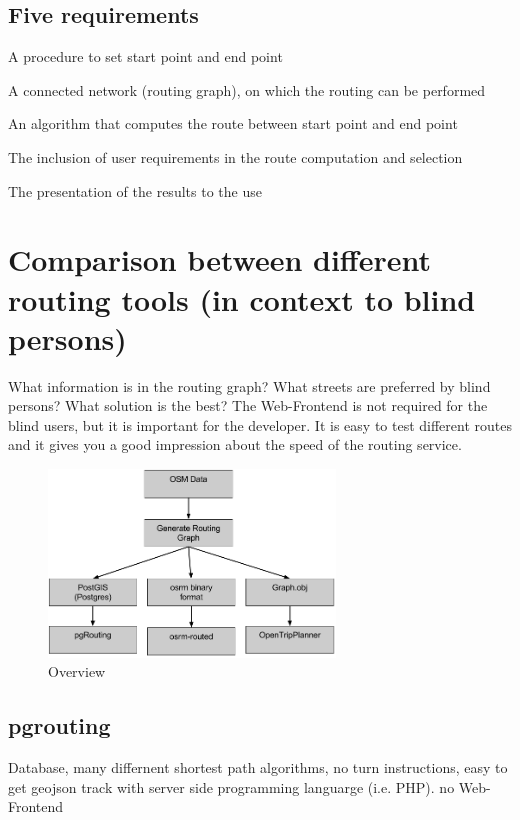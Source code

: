 \documentclass{sig-alternate}
\begin{document}
\subsection{Five requirements\cite{weyrer}}
\begin{description}
  \item A procedure to set start point and end point
  \item A connected network (routing graph), on which the routing can be performed
  \item An algorithm that computes the route between start point and end point
  \item The inclusion of user requirements in the route computation and selection
  \item The presentation of the results to the use
\end{description}


\section{Comparison between different routing tools (in context to blind persons)}

What information is in the routing graph? What streets are preferred by blind persons? What solution is the best?
The Web-Frontend is not required for the blind users, but it is important for the developer. It is easy to test different routes and it gives you a good impression about the speed of the routing service.

\begin{figure}
\centering
\includegraphics[width=3in]{Overview2.png}
\caption{Overview}
\end{figure}

\subsection{pgrouting\cite{pgrouting}}
Database, many differnent shortest path algorithms, no turn instructions, easy to get geojson track with server side programming languarge (i.e. PHP). no Web-Frontend
\end{document}
